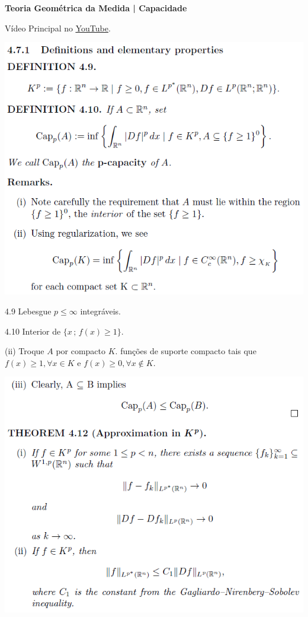 \documentclass[12pt]{article}
\begin{document}
\Large

\begin{center}
\textbf{Teoria Geom\'etrica da Medida | Capacidade}
\end{center}

\large

V\'ideo Principal no \href{https://www.youtube.com/watch?v=KlShZXH1WrE}{\color{blue}\underline{YouTube}}.

\vspace{3mm}

		\begin{center}
		\includegraphics[scale=.9]{1}
		\end{center}

4.9 Lebesgue $p \le \infty$ integr\'aveis.

4.10 Interior de $\{ x\,;\,f(x) \ge 1 \}$.

(ii) Troque $A$ por compacto $K$. fun\c{c}\~oes de suporte compacto tais que $f(x) \ge 1, \forall x \in K$ e $f(x) \ge 0, \forall x \notin K$.

\vspace{300mm}

		\begin{center}
		\includegraphics{2}
		\end{center}
\end{document}
